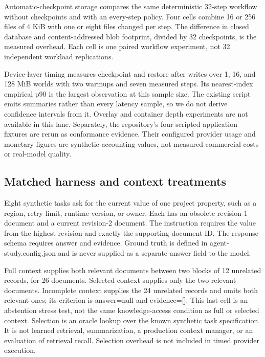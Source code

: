 \documentclass[11pt,a4paper]{article}
\begin{document}
Automatic-checkpoint storage compares the same deterministic 32-step workflow without checkpoints and with an every-step policy. Four cells combine 16 or 256 files of 4 KiB with one or eight files changed per step. The difference in closed database and content-addressed blob footprint, divided by 32 checkpoints, is the measured overhead. Each cell is one paired workflow experiment, not 32 independent workload replications.


Device-layer timing measures checkpoint and restore after writes over 1, 16, and 128 MiB worlds with two warmups and seven measured steps. Its nearest-index empirical p90 is the largest observation at this sample size. The existing script emits summaries rather than every latency sample, so we do not derive confidence intervals from it. Overlay and container depth experiments are not available in this lane. Separately, the repository's four scripted application fixtures are rerun as conformance evidence. Their configured provider usage and monetary figures are synthetic accounting values, not measured commercial costs or real-model quality.


\subsection{Matched harness and context treatments}

Eight synthetic tasks ask for the current value of one project property, such as a region, retry limit, runtime version, or owner. Each has an obsolete revision-1 document and a current revision-2 document. The instruction requires the value from the highest revision and exactly the supporting document ID. The response schema requires answer and evidence. Ground truth is defined in agent-study.config.json and is never supplied as a separate answer field to the model.


Full context supplies both relevant documents between two blocks of 12 unrelated records, for 26 documents. Selected context supplies only the two relevant documents. Incomplete context supplies the 24 unrelated records and omits both relevant ones; its criterion is answer=null and evidence=[]. This last cell is an abstention stress test, not the same knowledge-access condition as full or selected context. Selection is an oracle lookup over the known synthetic task specification. It is not learned retrieval, summarization, a production context manager, or an evaluation of retrieval recall. Selection overhead is not included in timed provider execution.
\end{document}
